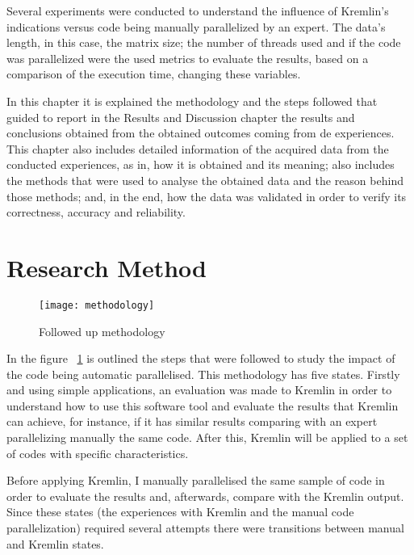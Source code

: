 Several experiments were conducted to understand the influence of Kremlin's indications versus code being manually parallelized  by an expert. The data's length, in this case, the matrix size; the number of threads used and if the code was parallelized were the used metrics to evaluate the results, based on a comparison of the execution time, changing these variables.

In this chapter it is explained the methodology and the steps followed that guided to report in the Results and Discussion chapter the results and conclusions obtained from the obtained outcomes coming from de experiences. This chapter also includes  detailed information of the acquired data from the conducted experiences, as in, how it is obtained and its meaning; also includes the methods that were used to analyse the obtained data and the reason behind those methods; and, in the end, how the data was validated in order to verify its correctness, accuracy and reliability.



\section{Research Method}

\begin{figure}[t]
	\begin{center}
		\leavevmode
		\texttt{[image: methodology]}
		\caption{Followed up methodology}
		\label{fig:method}
	\end{center}
\end{figure}


In the  figure ~\ref{fig:method} is outlined the steps that were followed to study the impact of the code being automatic parallelised. This methodology has five states. Firstly and using simple applications, an evaluation was made to Kremlin in order  to understand how to use this software tool and evaluate the results that Kremlin can achieve, for instance, if it has similar results comparing with an expert parallelizing manually the same code. After this, Kremlin will be applied to a set of codes with specific characteristics.

Before applying Kremlin, I manually parallelised the same sample of code in order to evaluate the results and, afterwards, compare with the Kremlin output. Since these states (the experiences with Kremlin and the manual code parallelization) required several attempts there were transitions between manual and Kremlin states. 

